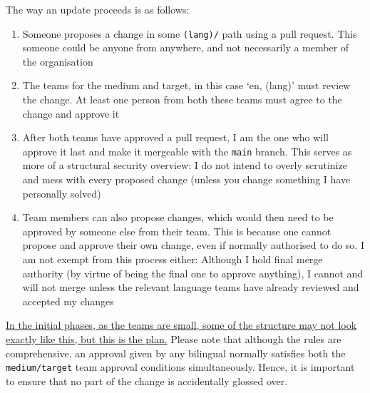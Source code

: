 \documentclass[12pt,twoside]{article}
\newcommand*{\ut}[1]{\uline{#1}}
\begin{document}
The way an update proceeds is as follows:
\begin{enumerate}
    \item Someone proposes a change in some \texttt{(lang)/} path using a pull request. This someone could be anyone from anywhere, and not necessarily a member of the organisation
    \item The teams for the medium and target, in this case `en, (lang)' must review the change. At least one person from both these teams must agree to the change and approve it
    \item After both teams have approved a pull request, I am the one who will approve it last and make it  mergeable  with the \texttt{main} branch. This serves as more of a structural security overview: I do not intend to overly scrutinize and mess with every proposed change (unless you change something I have personally solved)
    \item Team members can also propose changes, which would then need to be approved by someone else from their team. This is because one cannot propose and approve their own change, even if normally authorised to do so. I am not exempt from this process either: Although I hold final merge authority (by virtue of being the final one to approve anything), I cannot and will not merge unless the relevant language teams have already reviewed and accepted my changes
\end{enumerate}
\ut{In the initial phases, as the teams are small, some of the structure may not look exactly like this, but this is the plan.} Please note that although the rules are comprehensive, an approval given by any bilingual normally satisfies both the \texttt{medium/target} team approval conditions simultaneously. Hence, it is important to ensure that no part of the change is accidentally glossed  over.
\end{document}
